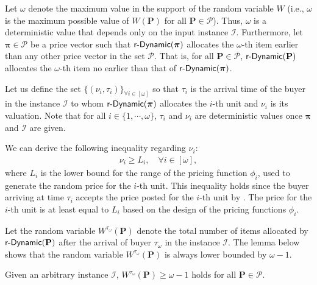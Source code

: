Let $\omega$ denote the maximum value in the support of the random variable $ W $ (i.e., $ \omega $ is the maximum possible value of $ W(\mathbf{P}) $ for all $ \mathbf{P}\in\mathcal{P}$). Thus, $\omega$ is a deterministic value that depends only on the input instance $\mathcal{I}$. Furthermore, let $\boldsymbol{\pi} \in \mathcal{P}$ be a price vector such that $\textsf{r-Dynamic}(\boldsymbol{\pi})$ allocates the $\omega$-th item earlier than any other price vector in the set $\mathcal{P}$. That is, for all $ \mathbf{P}\in \mathcal{P}$, $\textsf{r-Dynamic}(\mathbf{P})$ allocates the $\omega$-th item no earlier than that of $\textsf{r-Dynamic}(\boldsymbol{\pi})$. 

Let us define the set $\{(\nu_{i},\tau_{i})\}_{\forall i\in [\omega]}$ so that $\tau_{i}$ is the arrival time of the buyer in the instance $ \mathcal{I} $ to whom $\textsf{r-Dynamic}(\boldsymbol{\pi})$ allocates the $i$-th unit and $\nu_i$ is its valuation. Note that for all $ i \in \{1, \cdots, \omega\} $,  $ \tau_i $ and $\nu_i$ are deterministic values once $ \boldsymbol{\pi}$ and $ \mathcal{I} $ are given.  

We can derive the following inequality regarding $\nu_{i}$:
\begin{align}
\label{eq:upper-bound-large-inventory-proof-1}
\nu_{i} \ge L_{i}, \quad \forall i \in [\omega],
\end{align}
where $L_{i}$ is the lower bound for the range of the pricing function $\phi_{i}$, used to generate the random price for the $i$-th unit. This inequality holds since the buyer arriving at time $\tau_{i}$ accepts the price posted for the $i$-th unit by \rDynamic. The price for the $i$-th unit is at least equal to $L_{i}$  based on the design of the pricing functions $\phi_{i}$.

Let the random variable $W^{\tau_{\omega}}(\mathbf{P}) $ denote the total number of items allocated by $\textsf{r-Dynamic}(\mathbf{P})$ after the arrival of buyer $\tau_{\omega}$ in the instance $\mathcal{I}$. The lemma below shows that the random variable $ W^{\tau_{\omega}}(\mathbf{P}) $ is always lower bounded by $ \omega - 1$.


\begin{lemma}\label{appendix:prop:omega-1}
Given an arbitrary instance $ \mathcal{I} $, $ W^{\tau_{\omega}}(\mathbf{P}) \geq \omega - 1$ holds for all $ \boldsymbol{P} \in \mathcal{P} $.
\end{lemma}

